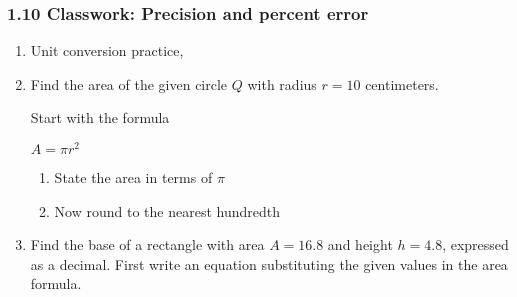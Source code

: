 

\fancyhead[LE]{\thepage}



\subsubsection*{1.10 Classwork: Precision and percent error} 
\begin{enumerate}
\item Unit conversion practice, 


\item Find the area of the given circle $Q$ with radius $r=10$ centimeters.
  \begin{multicols}{2}
  \raggedcolumns
  Start with the formula \par \medskip
  $A = \pi r^2$ 
  \begin{enumerate}
    \item State the area in terms of $\pi$ \vspace{1.7cm}
    \item Now round to the nearest hundredth
  \end{enumerate}
  \end{multicols}

\item Find the base of a rectangle with area $A=16.8$ and height $h=4.8$, expressed as a decimal. First write an equation substituting the given values in the area formula.
  \begin{flushright}
  \end{flushright}


\end{enumerate}
